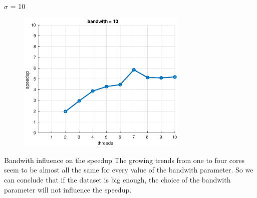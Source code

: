 \documentclass{beamer}
\begin{document}
\begin{frame}{$\sigma$ = 10}

\begin{figure}[H]
\centering
\includegraphics[width=3.2in]{../Paper/fig/speedup10b.eps}
\end{figure}

\end{frame}

\begin{frame}{Bandwith influence on the speedup}
The growing trends from one to four cores seem to be almost all the same for every value of the bandwith parameter. So we can conclude that if the dataset is big enough, the choice of the bandwith parameter will not influence the speedup.
\end{frame}
\end{document}
